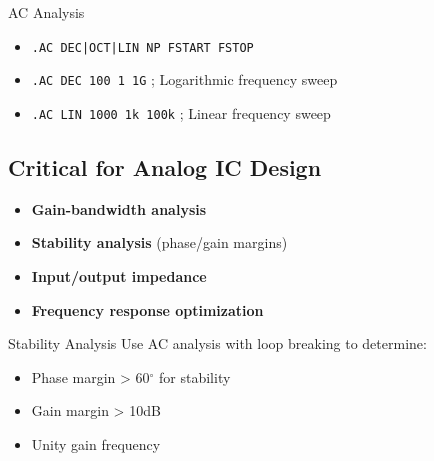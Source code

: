 \documentclass{beamer}
\begin{document}
\begin{frame}{AC Analysis}
    \begin{itemize}
        \item \texttt{.AC DEC|OCT|LIN NP FSTART FSTOP}
        \item \texttt{.AC DEC 100 1 1G} ; Logarithmic frequency sweep
        \item \texttt{.AC LIN 1000 1k 100k} ; Linear frequency sweep
    \end{itemize}
    
    \subsection{Critical for Analog IC Design}
    \begin{itemize}
        \item \textbf{Gain-bandwidth analysis}
        \item \textbf{Stability analysis} (phase/gain margins)
        \item \textbf{Input/output impedance}
        \item \textbf{Frequency response optimization}
    \end{itemize}
    
    \begin{exampleblock}{Stability Analysis}
        Use AC analysis with loop breaking to determine:
        \begin{itemize}
            \item Phase margin > 60$^\circ$ for stability
            \item Gain margin > 10dB
            \item Unity gain frequency
        \end{itemize}
    \end{exampleblock}
\end{frame}
\end{document}
